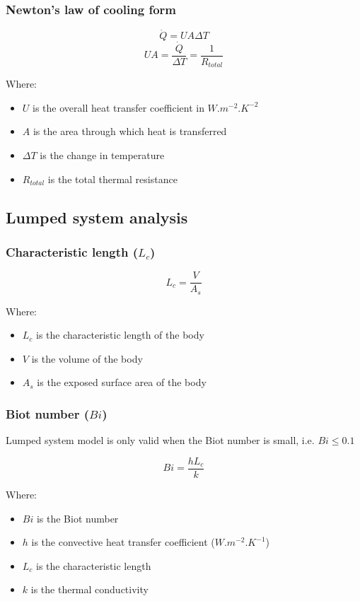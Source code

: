 \documentclass[11pt]{article}
\begin{document}
\subsubsection{Newton's law of cooling form}
\label{sec:org4e4c999}
\[\dot{Q} = UA \Delta T\]
\[UA = \frac{\dot{Q}}{\Delta T} = \frac{1}{R_{total}}\]

Where:
\begin{itemize}
\item \(U\) is the overall heat transfer coefficient in \(\unit{W.m^{-2}.K^{-2}}\)
\item \(A\) is the area through which heat is transferred
\item \(\Delta T\) is the change in temperature
\item \(R_{total}\) is the total thermal resistance
\end{itemize}

 \newpage
\subsection{Lumped system analysis}
\label{sec:orgdedbd19}

\subsubsection{Characteristic length (\(L_c\))}
\label{sec:org801e65d}
\[L_c = \frac{V}{A_s}\]

Where:
\begin{itemize}
\item \(L_c\) is the characteristic length of the body
\item \(V\) is the volume of the body
\item \(A_s\) is the exposed surface area of the body
\end{itemize}
\subsubsection{Biot number (\(Bi\))}
\label{sec:org1c348c8}
Lumped system model is only valid when the Biot number is small, i.e. \(Bi \le 0.1\)

\[Bi = \frac{h L_c}{k}\]

Where:
\begin{itemize}
\item \(Bi\) is the Biot number
\item \(h\) is the convective heat transfer coefficient (\(\unit{W.m^{-2}.K^{-1}}\))
\item \(L_c\) is the characteristic length
\item \(k\) is the thermal conductivity
\end{itemize}
\end{document}
